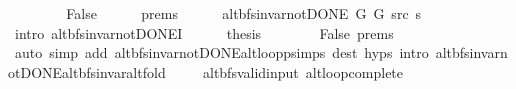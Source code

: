 \begin{isabellebody}
\ \ \isamarkupfalse%
\isanewline
\ \ \ \ \isamarkupfalse%
\ False\isanewline
\ \ \ \ \isamarkupfalse%
\ {\isachardoublequoteopen}{}{\isachardot}{\kern0pt}prems{\isachardoublequoteclose}{\isacharparenleft}{\kern0pt}{}{\isacharparenright}{\kern0pt}\isanewline
\ \ \ \ \isamarkupfalse%
\ {\isachardoublequoteopen}alt{\isacharunderscore}{\kern0pt}bfs{\isacharunderscore}{\kern0pt}invar{\isacharunderscore}{\kern0pt}not{\isacharunderscore}{\kern0pt}DONE{\isacharprime}{\kern0pt}\ G{}\ G{}\ src\ s{\isachardoublequoteclose}\isanewline
\ \ \ \ \ \ \isamarkupfalse%
\ {\isacharparenleft}{\kern0pt}intro\ alt{\isacharunderscore}{\kern0pt}bfs{\isacharunderscore}{\kern0pt}invar{\isacharunderscore}{\kern0pt}not{\isacharunderscore}{\kern0pt}DONE{\isacharprime}{\kern0pt}I{\isacharparenright}{\kern0pt}\isanewline
\ \ \ \ \isamarkupfalse%
\ {\isacharquery}{\kern0pt}thesis\isanewline
\ \ \ \ \ \ \isamarkupfalse%
\ False\ {\isachardoublequoteopen}{}{\isachardot}{\kern0pt}prems{\isachardoublequoteclose}{\isacharparenleft}{\kern0pt}{}{\isacharparenright}{\kern0pt}\isanewline
\ \ \ \ \ \ \isamarkupfalse%
\ {\isacharparenleft}{\kern0pt}auto\ simp\ add{\isacharcolon}{\kern0pt}\ alt{\isacharunderscore}{\kern0pt}bfs{\isacharunderscore}{\kern0pt}invar{\isacharunderscore}{\kern0pt}not{\isacharunderscore}{\kern0pt}DONE{\isachardot}{\kern0pt}alt{\isacharunderscore}{\kern0pt}loop{\isacharunderscore}{\kern0pt}psimps\ dest{\isacharcolon}{\kern0pt}\ {\isachardoublequoteopen}{}{\isachardot}{\kern0pt}hyps{\isachardoublequoteclose}\ intro{\isacharcolon}{\kern0pt}\ alt{\isacharunderscore}{\kern0pt}bfs{\isacharunderscore}{\kern0pt}invar{\isacharunderscore}{\kern0pt}not{\isacharunderscore}{\kern0pt}DONE{\isachardot}{\kern0pt}alt{\isacharunderscore}{\kern0pt}bfs{\isacharunderscore}{\kern0pt}invar{\isacharunderscore}{\kern0pt}alt{\isacharunderscore}{\kern0pt}fold{\isacharparenright}{\kern0pt}\isanewline
\ \ \isamarkupfalse%
\isanewline
{}\isamarkupfalse%
%
\endisatagproof
{\isafoldproof}%
%
\isadelimproof
\isanewline
%
\endisadelimproof
\isanewline
{}\isamarkupfalse%
\ {\isacharparenleft}{\kern0pt}\ alt{\isacharunderscore}{\kern0pt}bfs{\isacharunderscore}{\kern0pt}valid{\isacharunderscore}{\kern0pt}input{\isacharparenright}{\kern0pt}\ alt{\isacharunderscore}{\kern0pt}loop{\isacharunderscore}{\kern0pt}complete{\isacharcolon}{\kern0pt}\isanewline

\end{isabellebody}
